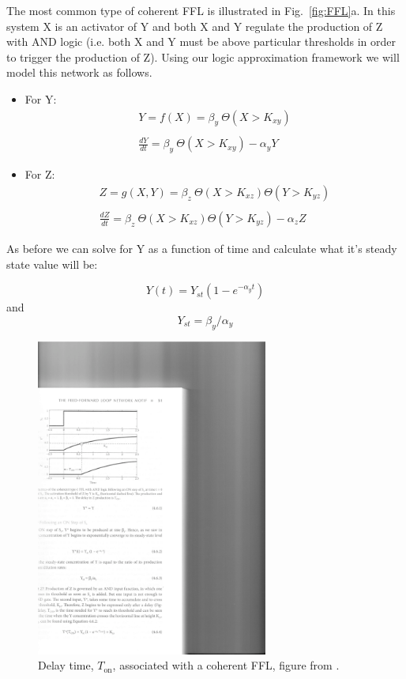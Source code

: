 \documentclass[11pt,letterpaper,oneside,pagesize]{scrartcl}
\begin{document}
The most common type of coherent FFL is illustrated in Fig.~\ref{fig:FFL}a.  In this system X is an activator of Y and both X and Y regulate the production of Z with AND logic (i.e. both X and Y must be above particular thresholds in order to trigger the production of Z). Using our logic approximation framework we will model this network as follows.
\begin{itemize}
    \item For Y:
\begin{eqnarray*}
Y = f(X) = \beta_y\ \Theta(X > K_{xy})
\\
\\
\frac{dY}{dt} = \beta_y\ \Theta(X > K_{xy}) - \alpha_{y}Y
\end{eqnarray*}

    \item For Z:
\begin{eqnarray*}
Z = g(X,Y) = \beta_z\ \Theta(X > K_{xz})\Theta(Y > K_{yz})
\\
\\
\frac{dZ}{dt} = \beta_z\ \Theta(X > K_{xz})\Theta(Y > K_{yz}) - \alpha_{z}Z
\end{eqnarray*}

\end{itemize}

As before we can solve for Y as a function of time and calculate what it's steady state value will be:

\[
Y(t) = Y_{st}(1-e^{-\alpha_{y}t})
\]
and
\[
Y_{st}=\beta_y/\alpha_y
\]

\begin{figure}[lht]
\centering
 \includegraphics[width=3in]{coh-ffl-Ton.pdf}
\caption{Delay time, $T_{\mathrm{on}}$, associated with a coherent FFL, figure from \cite{Alon2007book}.}
\label{fig:fflton}
\end{figure}
\end{document}
